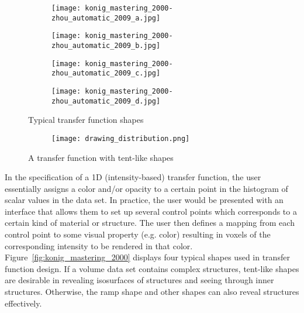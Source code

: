 \begin{figure}
\centering

\begin{subfigure}{.24\textwidth}
\texttt{[image: konig\_mastering\_2000-zhou\_automatic\_2009\_a.jpg]}
\end{subfigure}
\begin{subfigure}{.24\textwidth}
\texttt{[image: konig\_mastering\_2000-zhou\_automatic\_2009\_b.jpg]}
\end{subfigure}
\begin{subfigure}{.24\textwidth}
\texttt{[image: konig\_mastering\_2000-zhou\_automatic\_2009\_c.jpg]}
\end{subfigure}
\begin{subfigure}{.24\textwidth}
\texttt{[image: konig\_mastering\_2000-zhou\_automatic\_2009\_d.jpg]}
\end{subfigure}
\caption{Typical transfer function shapes \cite{konig_mastering_2000}}
\label{fig:konig_mastering_2000}
\begin{subfigure}{.6\textwidth}
\centering
\texttt{[image: drawing\_distribution.png]}
\end{subfigure}
\caption{A transfer function with tent-like shapes}
\label{fig:drawing_distribution}
\end{figure}

In the specification of a 1D (intensity-based) transfer function, the user essentially assigns a color and/or opacity to a certain point in the histogram of scalar values in the data set. In practice, the user would be presented with an interface that allows them to set up several control points which corresponds to a certain kind of material or structure. The user then defines a mapping from each control point to some visual property (e.g. color) resulting in voxels of the corresponding intensity to be rendered in that color.
Figure~\ref{fig:konig_mastering_2000} displays four typical shapes used in transfer function design.
If a volume data set contains complex structures, tent-like shapes are desirable in revealing isosurfaces of structures and seeing through inner structures. Otherwise, the ramp shape and other shapes can also reveal structures effectively.%


